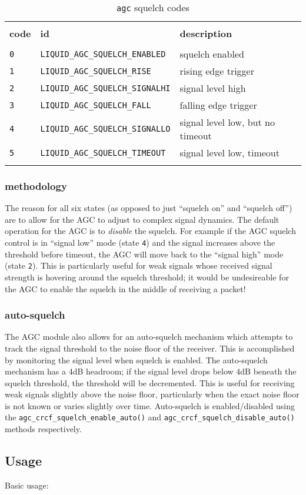 \begin{table}[!ht]
\caption{{\tt agc} squelch codes}
\label{tab:module:agc:squelch_codes}
\centering
\begin{tabular*}{0.95\textwidth}{@{\extracolsep{\fill}}lll}

\hline\hline \\[-6pt]
{\bf code} & {\bf id} & {\bf description} \\[6pt]
\hline \\[-6pt]
{\tt 0} & {\tt LIQUID\_AGC\_SQUELCH\_ENABLED}    & squelch enabled \\
{\tt 1} & {\tt LIQUID\_AGC\_SQUELCH\_RISE}       & rising edge trigger \\
{\tt 2} & {\tt LIQUID\_AGC\_SQUELCH\_SIGNALHI}   & signal level high \\
{\tt 3} & {\tt LIQUID\_AGC\_SQUELCH\_FALL}       & falling edge trigger \\
{\tt 4} & {\tt LIQUID\_AGC\_SQUELCH\_SIGNALLO}   & signal level low, but no timeout \\
{\tt 5} & {\tt LIQUID\_AGC\_SQUELCH\_TIMEOUT}    & signal level low, timeout \\ \\[-6pt]

\hline\hline
\end{tabular*}
\end{table}%


\subsubsection{methodology}
The reason for all six states (as opposed to just ``squelch on'' and ``squelch
off'') are to allow for the AGC to adjust to complex signal dynamics.
The default operation for the AGC is to {\it disable} the squelch.
For example if the AGC squelch control is in ``signal low'' mode
(state {\tt 4}) and the signal increases above the threshold before timeout,
the AGC will move back to the ``signal high'' mode (state {\tt 2}).
This is particularly useful for weak signals whose received signal strength is
hovering around the squelch threshold; it would be undesireable for the AGC to
enable the squelch in the middle of receiving a packet!

\subsubsection{auto-squelch}
The AGC module also allows for an auto-squelch mechanism which attempts to
track the signal threshold to the noise floor of the receiver.
This is accomplished by monitoring the signal level when squelch is enabled.
The auto-squelch mechanism has a 4dB headroom; if the signal level drops below
4dB beneath the squelch threshold, the threshold will be decremented.
This is useful for receiving weak signals slightly above the noise floor,
particularly when the exact noise floor is not known or varies slightly over
time.
Auto-squelch is enabled/disabled using the
{\tt agc\_crcf\_squelch\_enable\_auto()} and 
{\tt agc\_crcf\_squelch\_disable\_auto()} methods respectively.

\subsection{Usage}
Basic usage:


